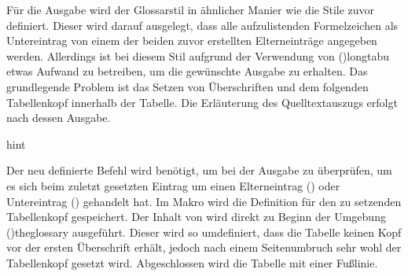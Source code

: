 \documentclass[%
  english,ngerman,%
  cdgeometry=no,DIV=12,%
  cd=false,cdfont=false,cdtitle=true,%
  headings=normal,%
  automark,%
  listof=toc,%
]{tudscrartcl}
\begin{document}
Für die Ausgabe wird der Glossarstil  in ähnlicher 
Manier wie die Stile zuvor definiert. Dieser wird darauf ausgelegt, dass alle 
aufzulistenden Formelzeichen als Untereintrag von einem der beiden zuvor 
erstellten Elterneinträge angegeben werden. Allerdings ist bei diesem Stil 
aufgrund der Verwendung von \Environment(){longtabu} etwas 
Aufwand zu betreiben, um die gewünschte Ausgabe zu erhalten. Das grundlegende 
Problem ist das Setzen von Überschriften und dem folgenden Tabellenkopf 
innerhalb der Tabelle. Die Erläuterung des Quelltextauszugs erfolgt nach dessen 
Ausgabe.
%
\CodeHook{\let\newglossarystyle\renewglossarystyle}
\begin{Code}{hint}
\end{Code}

Der neu definierte Befehl  wird benötigt, um bei der 
Ausgabe zu überprüfen, um es sich beim zuletzt gesetzten Eintrag um einen 
Elterneintrag () oder Untereintrag () 
gehandelt hat. Im Makro  wird die Definition für den zu 
setzenden Tabellenkopf gespeichert. Der Inhalt von  wird 
direkt zu Beginn der Umgebung \Environment(){theglossary} 
ausgeführt. Dieser wird so umdefiniert, dass die Tabelle keinen Kopf vor der 
ersten Überschrift erhält, jedoch nach einem Seitenumbruch sehr wohl der 
Tabellenkopf gesetzt wird. Abgeschlossen wird die Tabelle mit einer Fußlinie.
\end{document}
